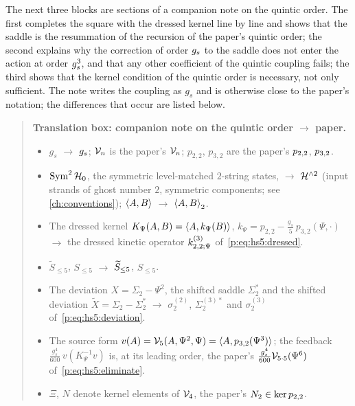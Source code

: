 The next three blocks are sections of a companion note on the quintic order.
The first completes the square with the dressed kernel line by line and shows that the saddle is the resummation of the recursion of the paper's quintic order; the second explains why the correction of order $\gs$ to the saddle does not enter the action at order $\gs^3$, and that any other coefficient of the quintic coupling fails; the third shows that the kernel condition of the quintic order is necessary, not only sufficient.
The note writes the coupling as $g_s$ and is otherwise close to the paper's notation; the differences that occur are listed below.

\begin{quote}
  \small
  \textbf{Translation box: companion note on the quintic order $\to$ paper.}
  \begin{itemize}
    \setlength{\itemsep}{0.3ex}
    \item $g_s$ $\to$ $\gs$; $\mc V_n$ is the paper's $\vertex{n}$; $p_{2,2}$, $p_{3,2}$ are the paper's $\sprod{2}{2}$, $\sprod{3}{2}$.
    \item $\Sym^2 \mc H_0$, the symmetric level-matched $2$-string states, $\to$ $\Hn{2}$ (input strands of ghost number $2$, symmetric components; see \cref{ch:conventions}); $\braket{A, B}$ $\to$ $\pair[2]{A}{B}$.
    \item The dressed kernel $K_\Psi(A, B) = \braket{A, k_\Psi(B)}$, $k_\Psi = p_{2,2} - \tfrac{g_s}{5} \, p_{3,2}(\Psi, \cdot)$ $\to$ the dressed kinetic operator $\kin{2}{\Psi}{3}$ of~\eqref{p:eq:hs5:dressed}.
    \item $\widetilde S_{\le 5}$, $S_{\le 5}$ $\to$ $\caction[\le 5]$, $S_{\le 5}$.
    \item The deviation $X = \Sigma_2 - \Psi^2$, the shifted saddle $\Sigma_2^*$ and the shifted deviation $\tilde X = \Sigma_2 - \Sigma_2^*$ $\to$ $\sigma_2^{(2)}$, $\Sigma_2^{(3)*}$ and $\sigma_2^{(3)}$ of~\eqref{p:eq:hs5:deviation}.
    \item The source form $v(A) = \mc V_5(A, \Psi^2, \Psi) = \braket{A, p_{3,2}(\Psi^3)}$; the feedback $\tfrac{g_s^4}{600} \, v(K_\Psi^{-1} v)$ is, at its leading order, the paper's $\tfrac{\gs^4}{600} \vertex{5 \cdot 5}(\Psi^6)$ of~\eqref{p:eq:hs5:eliminate}.
    \item $\Xi$, $N$ denote kernel elements of $\mc V_4$, the paper's $N_2 \in \ker \sprod{2}{2}$.
  \end{itemize}
\end{quote}



